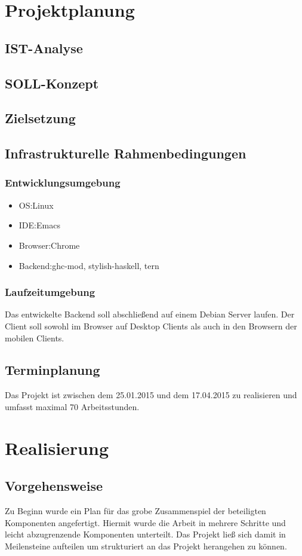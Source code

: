 \documentclass[12pt,a4paper]{scrartcl}
\begin{document}
\section{Projektplanung}
\subsection{IST-Analyse}
\subsection{SOLL-Konzept}
\subsection{Zielsetzung}
\subsection{Infrastrukturelle Rahmenbedingungen}
\subsubsection{Entwicklungsumgebung}
\begin{itemize}
\item OS:Linux
\item IDE:Emacs
\item Browser:Chrome
\item Backend:ghc-mod, stylish-haskell, tern
\end{itemize}
\subsubsection{Laufzeitumgebung}
Das entwickelte Backend soll abschließend auf einem Debian Server laufen. Der Client soll sowohl im Browser auf Desktop Clients als auch in den Browsern der mobilen Clients.
\subsection{Terminplanung}
Das Projekt ist zwischen dem 25.01.2015 und dem 17.04.2015 zu realisieren und umfasst maximal 70 Arbeitsstunden.
\section{Realisierung}
\subsection{Vorgehensweise}
Zu Beginn wurde ein Plan für das grobe Zusammenspiel der beteiligten Komponenten angefertigt. Hiermit wurde die Arbeit in mehrere Schritte und leicht abzugrenzende Komponenten unterteilt. Das Projekt ließ sich damit in Meilensteine aufteilen um strukturiert an das Projekt herangehen zu können.
\end{document}
